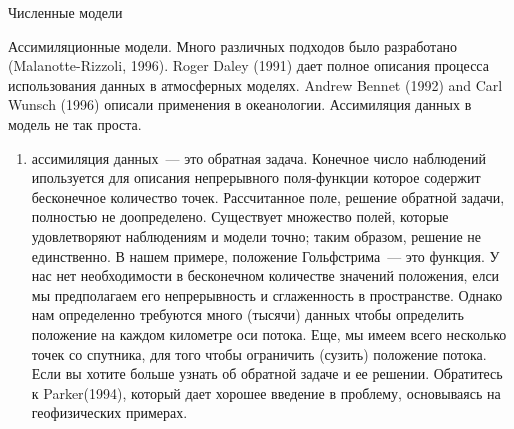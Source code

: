 \begin{chapter}{Численные модели}
\begin{section}{Ассимиляционные модели.}
Много различных подходов было разработано (Malanotte-Rizzoli,
1996). Roger Daley (1991) дает полное описания процесса использования
данных в атмосферных моделях. Andrew Bennet (1992) and Carl Wunsch
(1996) описали применения в океанологии. Ассимиляция данных в модель
не так проста.
%
%
\begin{enumerate}
\item
ассимиляция данных~--- это обратная задача. Конечное число наблюдений
ипользуется для описания непрерывного поля-функции которое содержит
бесконечное количество точек. Рассчитанное поле, решение обратной
задачи, полностью не доопределено. Существует множество полей, которые
удовлетворяют наблюдениям и модели точно; таким образом, решение не
единственно. В нашем примере, положение Гольфстрима~--- это
функция. У нас нет необходимости в бесконечном количестве значений
положения, елси мы предполагаем его непрерывность и сглаженность в
пространстве. Однако нам определенно требуются много (тысячи) данных
чтобы определить положение на каждом километре оси потока. Еще, мы
имеем всего несколько точек со спутника, для того чтобы ограничить
(сузить) положение потока. Если вы хотите больше узнать об обратной
задаче и ее решении. Обратитесь к Parker(1994), который дает хорошее
введение в проблему, основываясь на геофизических примерах.
%
%


\end{enumerate}
\end{section}
\end{chapter}
